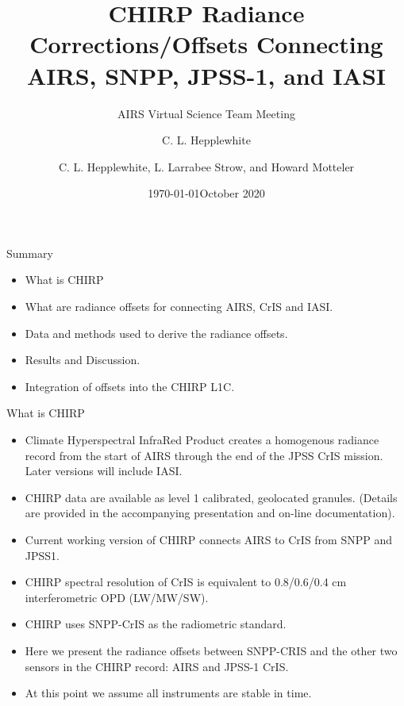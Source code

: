 \documentclass[10pt,t]{beamer}
\author{C. L. Hepplewhite}
\date{\today}
\title{\large CHIRP Radiance Corrections/Offsets Connecting AIRS, SNPP, JPSS-1, and IASI}
\subtitle{\footnotesize{AIRS Virtual Science Team Meeting}}
\date{\vspace{0.1in}\footnotesize{October 2020 \vfill}}
\author{C. L. Hepplewhite\inst{2}, L. Larrabee Strow\inst{1,2}, and Howard Motteler\inst{2} }
\institute[UMBC]{\inst{1} UMBC Physics Dept. \and \inst{2}UMBC JCET}
\begin{document}
\maketitle

\begin{frame}{Summary}
\begin{itemize}
  \item What is CHIRP
  \item What are radiance offsets for connecting AIRS, CrIS and IASI.
  \item Data and methods used to derive the radiance offsets.
  \item Results and Discussion.
  \item Integration of offsets into the CHIRP L1C.
    
\end{itemize}

\end{frame}
\begin{frame}{What is CHIRP}

  \begin{itemize}
  \item Climate Hyperspectral InfraRed Product creates a homogenous radiance
    record from the start of AIRS through the end of the JPSS CrIS mission. Later versions will include IASI.
  \item CHIRP data are available as level 1 calibrated, geolocated granules.
    (Details are provided in the accompanying presentation and on-line documentation).
  \item Current working version of CHIRP connects AIRS to CrIS from SNPP and JPSS1.
  \item CHIRP spectral resolution of CrIS is equivalent to  0.8/0.6/0.4 cm interferometric OPD (LW/MW/SW).
  \item CHIRP uses SNPP-CrIS as the radiometric standard.
  \item Here we present the radiance offsets between SNPP-CRIS and the other two sensors in the CHIRP record: AIRS and JPSS-1 CrIS.
  \item At this point we assume all instruments are stable in time.    
  \end{itemize}

\end{frame}
\end{document}
